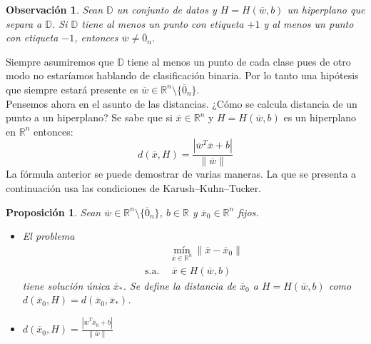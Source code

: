 \documentclass[11pt]{article}
\newtheorem{observation}{Observación}[section]
\newtheorem{proposition}{Proposición}[section]
\newcommand{\R}{\mathbb{R}}
\newcommand{\Rn}{\R^{n}}
\newcommand{\wv}{\overline{w}}
\newcommand{\x}{\overline{x}}
\newcommand{\xz}{\overline{x}_{0}}
\newcommand{\z}{\overline{0}_{n}}
\newcommand{\Rnz}{\Rn\setminus\{\z\}}
\newcommand{\xo}{\overline{x}_{*}}
\newcommand{\Dat}{\mathbb{D}}
\newcommand{\nw}{\|\wv\|}
\begin{document}
\begin{observation}
Sean $\Dat$ un conjunto de datos y $H=H(\wv, b)$ un hiperplano que separa a $\Dat$. Si $\Dat$ tiene al menos un punto con etiqueta $+1$ y al menos un punto con etiqueta $-1$, entonces $\wv\ne\z$.
\end{observation}

Siempre asumiremos que $\Dat$ tiene al menos un punto de cada clase pues de otro modo no estaríamos hablando de clasificación binaria. Por lo tanto una hipótesis que siempre estará presente es $\wv\in\Rnz$.\\

Pensemos ahora en el asunto de las distancias. ¿Cómo se calcula distancia de un punto a un hiperplano? Se sabe que si $\x\in\Rn$ y $H=H(\wv, b)$ es un hiperplano en $\Rn$ entonces:
$$d(\x, H)=\frac{|\wv^{T}\x+b|}{\|\wv\|}$$
La fórmula anterior se puede demostrar de varias maneras. La que se presenta a continuación usa las condiciones de Karush--Kuhn--Tucker.
\begin{proposition}
Sean $\wv\in\Rnz$, $b\in\R$ y $\xz\in\Rn$ fijos.
\begin{itemize}
\item[(i)] El problema
\begin{equation*}
\begin{aligned}
& \underset{\x\in \Rn}{\text{mín}}\ \|\x-\xz\| \\
\text{s.a.}\ \
& \x\in H(\wv, b)
\end{aligned}
\end{equation*}
tiene solución única $\xo$. Se define la distancia de $\xz$ a $H=H(\wv, b)$ como $d(\xz, H)= d(\xz,\xo)$.
\item[(ii)] $d(\xz, H)=\frac{|\wv^{T}\xz+b|}{\nw}$
\end{itemize}
\end{proposition}
\end{document}
